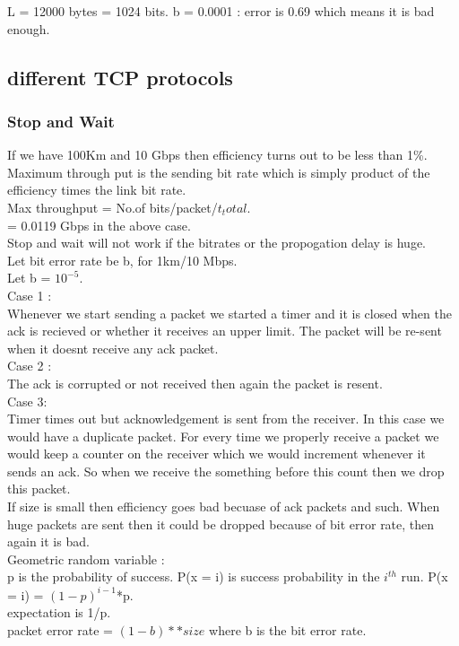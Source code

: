 \documentclass[solution,addpoints,12pt]{exam}
\begin{document}
L = 12000 bytes = 1024 bits. b = 0.0001 : error is 0.69
which means it is bad enough.\\
\subsection{different TCP protocols}
\subsubsection{Stop and Wait}
If we have 100Km and 10 Gbps then efficiency turns out
to be less than 1\%.\\
Maximum through put is the sending bit rate which is simply
product of the efficiency times the link bit rate.\\
Max throughput = No.of bits/packet/$t_total$.\\
= 0.0119 Gbps in the above case.\\
Stop and wait will not work if the bitrates or the propogation
delay is huge.\\
Let bit error rate be b, for 1km/10 Mbps.\\
Let b = $10^{-5}$.\\
Case 1 :\\
Whenever we start sending a packet we started a timer and it is
closed when the ack is recieved or whether it receives an upper
limit. The packet will be re-sent when it doesnt receive any
ack packet.\\
Case 2 :\\
The ack is corrupted or not received then again
the packet is resent.\\
Case 3:\\
Timer times out but acknowledgement is sent from the receiver.
In this case we would have a duplicate packet. For every time
we properly receive a packet we would keep a counter on the receiver
which we would increment whenever it sends an ack. So when
we receive the something before this count then we drop
this packet.\\
If size is small then efficiency goes bad becuase of ack packets and such.
When huge packets are sent then it could be dropped because of bit error rate,
then again it is bad.\\
Geometric random variable :\\
p is the probability of success.
P(x = i) is success probability in the $i^{th}$ run.
P(x = i) = $(1-p)^{i-1}$*p.\\
expectation is 1/p.\\
packet error rate = $(1-b)**{size}$ where b is the bit error rate.\\
\end{document}

